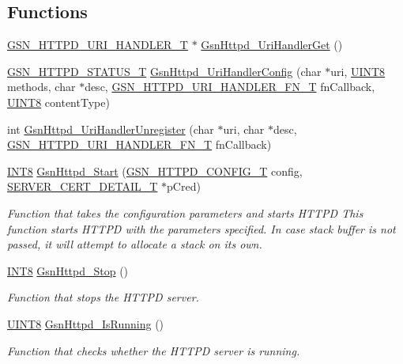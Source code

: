 \subsection*{Functions}
\begin{DoxyCompactItemize}
\item 
\hyperlink{a00097}{GSN\_\-HTTPD\_\-URI\_\-HANDLER\_\-T} $\ast$ \hyperlink{a00508_a2643c8de0e6a888d5b7666983fbeb0d3}{GsnHttpd\_\-UriHandlerGet} ()
\item 
\hyperlink{a00666_ga97ddf6ff1568f9984c83a2161cd9f49d}{GSN\_\-HTTPD\_\-STATUS\_\-T} \hyperlink{a00508_ae977d3f627843a55b5254f9191f664e7}{GsnHttpd\_\-UriHandlerConfig} (char $\ast$uri, \hyperlink{a00660_gab27e9918b538ce9d8ca692479b375b6a}{UINT8} methods, char $\ast$desc, \hyperlink{a00666_ga37351c58635a4a2a10675d5ea28e37be}{GSN\_\-HTTPD\_\-URI\_\-HANDLER\_\-FN\_\-T} fnCallback, \hyperlink{a00660_gab27e9918b538ce9d8ca692479b375b6a}{UINT8} contentType)
\item 
int \hyperlink{a00508_a355d9ac3d7fafffaf410302110c04f51}{GsnHttpd\_\-UriHandlerUnregister} (char $\ast$uri, char $\ast$desc, \hyperlink{a00666_ga37351c58635a4a2a10675d5ea28e37be}{GSN\_\-HTTPD\_\-URI\_\-HANDLER\_\-FN\_\-T} fnCallback)
\item 
\hyperlink{a00660_ga307b8734c020247f6bac4fcde0dcfbb9}{INT8} \hyperlink{a00666_gae82a556385532a5c373c2c9700fa0959}{GsnHttpd\_\-Start} (\hyperlink{a00095}{GSN\_\-HTTPD\_\-CONFIG\_\-T} config, \hyperlink{a00459}{SERVER\_\-CERT\_\-DETAIL\_\-T} $\ast$pCred)
\begin{DoxyCompactList}\small\item\em Function that takes the configuration parameters and starts HTTPD This function starts HTTPD with the parameters specified. In case stack buffer is not passed, it will attempt to allocate a stack on its own. \end{DoxyCompactList}\item 
\hyperlink{a00660_ga307b8734c020247f6bac4fcde0dcfbb9}{INT8} \hyperlink{a00666_gadb4c2b217e18fcf95a912c9680fd29a2}{GsnHttpd\_\-Stop} ()
\begin{DoxyCompactList}\small\item\em Function that stops the HTTPD server. \end{DoxyCompactList}\item 
\hyperlink{a00660_gab27e9918b538ce9d8ca692479b375b6a}{UINT8} \hyperlink{a00666_gaa6cb01078a42676719b577ab37df15c4}{GsnHttpd\_\-IsRunning} ()
\begin{DoxyCompactList}\small\item\em Function that checks whether the HTTPD server is running. \end{DoxyCompactList}\item 

\end{DoxyCompactItemize}
